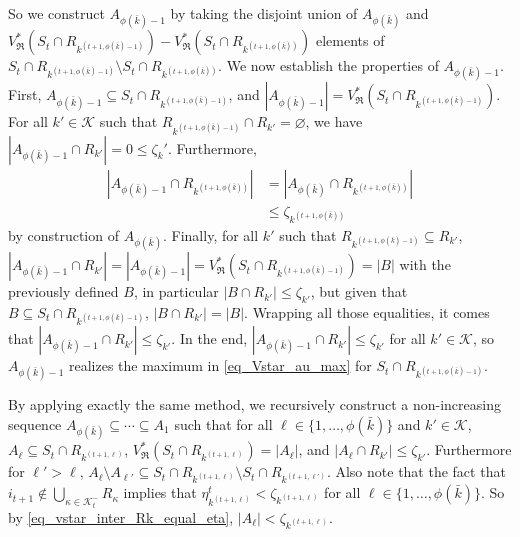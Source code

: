 \documentclass[
  11pt,
  a4paper,
]{article}
\theoremstyle{plain}
\theoremstyle{plain}
\theoremstyle{definition}
\theoremstyle{plain}
\theoremstyle{definition}
\theoremstyle{remark}
\begin{document}
So we construct \(A_{\phi(\bar k)-1}\) by taking the disjoint union of
\(A_{\phi(\bar k)}\) and
\(V^*_{\mathfrak{R}}(S_t \cap R_{k^{(t+1,\phi(\bar k)-1)}}) - V^*_{\mathfrak{R}}(S_t \cap R_{k^{(t+1,\phi(\bar k))}})\)
elements of
\(S_t\cap R_{k^{(t+1,\phi(\bar k)-1)}} \setminus S_t\cap R_{k^{(t+1,\phi(\bar k))}}\).
We now establish the properties of \(A_{\phi(\bar k)-1}\). First,
\(A_{\phi(\bar k)-1}\subseteq S_t \cap R_{k^{(t+1,\phi(\bar k)-1)}}\),
and
\(|A_{\phi(\bar k)-1}|=V^*_{\mathfrak{R}}(S_t \cap R_{k^{(t+1,\phi(\bar k)-1)}})\).
For all \(k'\in\mathcal{K}\) such that
\(R_{k^{(t+1,\phi(\bar k)-1)}} \cap R_{k'}=\varnothing\), we have
\(|A_{\phi(\bar k)-1}\cap R_{k'}|=0\leq \zeta_k'\). Furthermore,
\begin{align*}
|A_{\phi(\bar k)-1}\cap R_{   k^{(t+1,\phi(\bar k))}   }|&=|A_{\phi(\bar k)}\cap R_{   k^{(t+1,\phi(\bar k))}   }|\\
&\leq \zeta_{ k^{(t+1,\phi(\bar k))} }
\end{align*} by construction of \(A_{\phi(\bar k)}\). Finally, for all
\(k'\) such that \(R_{k^{(t+1,\phi(\bar k)-1)}}\subseteq R_{k'}\),
\(|A_{\phi(\bar k)-1}\cap R_{k'}|=|A_{\phi(\bar k)-1}|=V^*_{\mathfrak{R}}(S_t \cap R_{k^{(t+1,\phi(\bar k)-1)}})=|B|\)
with the previously defined \(B\), in particular
\(|B\cap R_{k'}|\leq \zeta_{k'}\), but given that
\(B\subseteq S_t \cap R_{k^{(t+1,\phi(\bar k)-1)}}\),
\(|B\cap R_{k'}|=|B|\). Wrapping all those equalities, it comes that
\(|A_{\phi(\bar k)-1}\cap R_{k'}|\leq \zeta_{k'}\). In the end,
\(|A_{\phi(\bar k)-1}\cap R_{k'}|\leq \zeta_{k'}\) for all
\(k'\in\mathcal{K}\), so \(A_{\phi(\bar k)-1}\) realizes the maximum in
\eqref{eq_Vstar_au_max} for \(S_t \cap R_{k^{(t+1,\phi(\bar k)-1)}}\).

By applying exactly the same method, we recursively construct a
non-increasing sequence \(A_{\phi(\bar k)}\subseteq\dotsb\subseteq A_1\)
such that for all \(\ell\in\{1,\dotsc, \phi(\bar k)\}\) and
\(k'\in\mathcal{K}\), \(A_\ell\subseteq S_t\cap R_{k^{(t+1,\ell)}}\),
\(V^*_{\mathfrak{R}}(S_t\cap R_{k^{(t+1,\ell)}})=|A_\ell|\), and
\(|A_\ell\cap R_{k'}|\leq \zeta_{k'}\). Furthermore for \(\ell'>\ell\),
\(A_{\ell}\setminus A_{\ell'}\subseteq S_t\cap R_{k^{(t+1,\ell)}}\setminus S_t\cap R_{k^{(t+1,\ell')}}\).
Also note that the fact that
\(i_{t+1}\not\in\bigcup_{\kappa\in\mathcal{K}^-_{t}}R_{\kappa}\) implies
that \(\eta^t_{k^{(t+1,\ell)}}<\zeta_{k^{(t+1,\ell)}}\) for all
\(\ell\in\{1,\dotsc, \phi(\bar k)\}\). So by
\eqref{eq_vstar_inter_Rk_equal_eta},
\(|A_\ell|<\zeta_{k^{(t+1,\ell)}}\).
\end{document}
